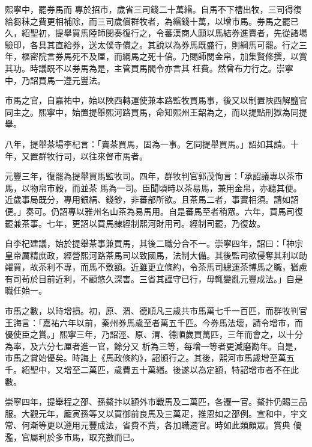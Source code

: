 \begin{pinyinscope}
 熙寧中，罷券馬而
 專於招市，歲省三司錢二十萬緡。自馬不下槽出牧，三司得復給芻秣之費更相補除，而三司歲償群牧者，為緡錢十萬，以增市馬。券馬之罷已久，紹聖初，提舉買馬陸師閔奏復行之，令蕃漢商人願以馬結券進賣者，先從諸場驗印，各具其直給券，送太僕寺償之。其說以為券馬既盛行，則綱馬可罷。行之三年，樞密院言券馬死不及厘，而綱馬之死十倍。乃賜師閔金帛，加集賢修撰，以賞其功。時議既不以券馬為是，主管買馬閻令亦言其
 枉費。然曾布力行之。崇寧中，乃詔買馬一遵元豐法。



 市馬之官，自嘉祐中，始以陜西轉運使兼本路監牧買馬事，後又以制置陜西解鹽官同主之。熙寧中，始置提舉熙河路買馬，命知熙州王韶為之，而以提點刑獄為同提舉。



 八年，提舉茶場李杞言：「賣茶買馬，固為一事。乞同提舉買馬。」詔如其請。十年，又置群牧行司，以往來督市馬者。



 元豐三年，復罷為提舉買馬監牧司。四年，群牧判官郭茂恂言：「承詔議專以茶市馬，以物帛市穀，而並茶
 馬為一司。臣聞頃時以茶易馬，兼用金帛，亦聽其便。近歲事局既分，專用銀絹、錢鈔，非蕃部所欲。且茶馬二者，事實相須。請如詔便。」奏可。仍詔專以雅州名山茶為易馬用。自是蕃馬至者稍眾。六年，買馬司復罷兼茶事。七年，更詔以買馬隸經制熙河財用司。經制司罷，乃復故。



 自李杞建議，始於提舉茶事兼買馬，其後二職分合不一。崇寧四年，詔曰：「神宗皇帝厲精庶政，經營熙河路茶馬司以致國馬，法制大備。其後監司欲侵奪其利以助
 糴買，故茶利不專，而馬不敷額。近雖更立條約，令茶馬司總運茶博馬之職，猶慮有司茍於目前近利，不顧悠久深害。三省其謹守已行，毋輒變亂元豐成法。」自是職任始一。



 市馬之數，以時增損。初，原、渭、德順凡三歲共市馬萬七千一百匹，而群牧判官王誨言：「嘉祐六年以前，秦州券馬歲至者萬五千匹。今券馬法壞，請令增市，而優使臣之賞。」熙寧三年，乃詔涇、原、渭、德順歲買萬匹，三年而會之，以十分為率，及六分七厘者進一官，餘分又
 析為三等，每增一等者更減磨勘年。自是，市馬之賞始優矣。時誨上《馬政條約》，詔頒行之。其後，熙河市馬歲增至萬五千。紹聖中，又增至二萬匹，歲費五十萬緡。後遂以為定額，特詔增市者不在此數。



 崇寧四年，提舉程之邵、孫鰲抃以額外市戰馬及二萬匹，各遷一官。鰲抃仍賜三品服。大觀元年，龐寅孫等又以買御前良馬及三萬疋，推恩如之邵例。宣和中，宇文常、何漸等更以遵用元豐成法，省費不貲，各加職遷官。時如此類頗眾。賞典
 優濫，官屬利於多市馬，取充數而已。




\end{pinyinscope}
